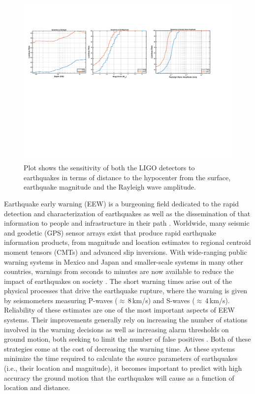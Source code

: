 \documentclass[twocolumn, aps, superscriptaddress]{revtex4}
\begin{document}
\begin{figure}[!htb]
  \includegraphics[width=\textwidth]{./plots/Lockloss_Sensitivity_4.pdf}
 \caption{Plot shows the sensitivity of both the LIGO detectors to earthquakes in terms of distance to the hypocenter from the surface, earthquake magnitude and the Rayleigh wave amplitude.}
 \label{fig:lockloss_sensitivity}
\end{figure}


Earthquake early warning (EEW) is a burgeoning field dedicated to the rapid detection and characterization of earthquakes as well as the dissemination of that information to people and infrastructure in their path \cite{Al2012,KuAl2013a,KuAl2013b,KuHe2014,CoLa2009a,CoLa2009b,BoAl2014,HoKa2008,HoEA2011c,StAl2016}.
Worldwide, many seismic and geodetic (GPS) sensor arrays exist that produce rapid earthquake information products, from magnitude and location estimates to regional centroid moment tensors (CMTs) and advanced slip inversions.
With wide-ranging public warning systems in Mexico and Japan and smaller-scale systems in many other countries, warnings from seconds to minutes are now available to reduce the impact of earthquakes on society \cite{StAl2016}.
The short warning times arise out of the physical processes that drive the earthquake rupture, where the warning is given by seismometers measuring P-waves ($\approx$\,8\,km/s) and S-waves ($\approx$\,4\,km/s).
Reliability of these estimates are one of the most important aspects of EEW systems. Their improvements generally rely on increasing the number of stations involved in the warning decisions as well as increasing alarm thresholds on ground motion, both seeking to limit the number of false positives \cite{KuCo2015}. Both of these strategies come at the cost of decreasing the warning time. 
As these systems minimize the time required to calculate the source parameters of earthquakes (i.e., their location and magnitude), it becomes important to predict with high accuracy the ground motion that the earthquakes will cause as a function of location and distance.
\end{document}
